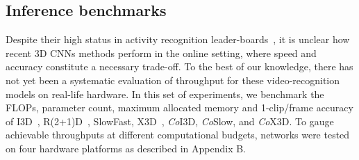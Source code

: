 \subsection{Inference benchmarks} \label{sec:inference-benchmarks}
Despite their high status in activity recognition leader-boards~\cite{paperswithcode2021kinetics400},
it is unclear how recent 3D CNNs methods perform in the online setting, where speed and accuracy constitute a necessary trade-off.
To the best of our knowledge, there has not yet been a systematic evaluation of throughput for these video-recognition models on real-life hardware.
%
In this set of experiments, we benchmark the FLOPs, parameter count, maximum allocated memory and 1-clip/frame accuracy of I3D~\cite{carreira2017quo}, R(2+1)D~\cite{tran2018closer}, SlowFast\cite{sovrasov2020ptflops}, X3D~\cite{feichtenhofer2020x3d}, \textit{Co}I3D, \textit{Co}Slow, and \textit{Co}X3D.
To gauge achievable throughputs at different computational budgets, networks were tested on four hardware platforms as described in Appendix B.

